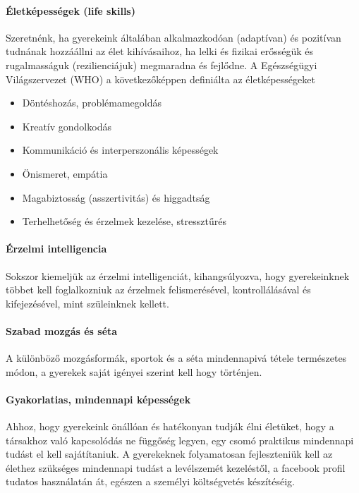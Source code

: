 \paragraph{Életképességek (life skills)}

Szeretnénk, ha gyerekeink általában alkalmazkodóan (adaptívan) és pozitívan tudnának hozzáállni az élet kihívásaihoz, ha lelki és fizikai erősségük és rugalmasságuk (rezilienciájuk) megmaradna és fejlődne.   A Egészségügyi Világszervezet (WHO) a következőképpen definiálta \citep{oecd99lifeskills} az életképességeket
\begin{itemize}
\item Döntéshozás, problémamegoldás

\item Kreatív gondolkodás

\item Kommunikáció és interperszonális képességek

\item Önismeret, empátia

\item Magabiztosság (asszertivitás) és higgadtság

\item Terhelhetőség és érzelmek kezelése, stressztűrés
\end{itemize}
\paragraph{Érzelmi intelligencia}

Sokszor kiemeljük az érzelmi intelligenciát, kihangsúlyozva, hogy gyerekeinknek többet kell foglalkozniuk az érzelmek felismerésével, kontrollálásával és kifejezésével, mint szüleinknek kellett.

\paragraph{Szabad mozgás és séta}

A különböző mozgásformák, sportok és a séta mindennapivá tétele természetes módon, a gyerekek saját igényei szerint kell hogy történjen.

\paragraph{Gyakorlatias, mindennapi képességek}

Ahhoz, hogy gyerekeink önállóan és hatékonyan tudják élni életüket, hogy a társakhoz való kapcsolódás ne függőség legyen, egy csomó praktikus mindennapi tudást el kell sajátítaniuk. A gyerekeknek folyamatosan fejleszteniük kell az élethez szükséges mindennapi tudást a levélszemét kezeléstől, a facebook profil tudatos használatán át, egészen a személyi költségvetés készítéséig.

